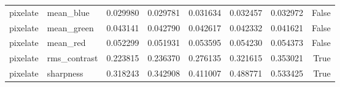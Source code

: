 \begin{tabular}{llrrrrrr}
pixelate & mean_blue & 0.029980 & 0.029781 & 0.031634 & 0.032457 & 0.032972 & False \\
pixelate & mean_green & 0.043141 & 0.042790 & 0.042617 & 0.042332 & 0.041621 & False \\
pixelate & mean_red & 0.052299 & 0.051931 & 0.053595 & 0.054230 & 0.054373 & False \\
pixelate & rms_contrast & 0.223815 & 0.236370 & 0.276135 & 0.321615 & 0.353021 & True \\
pixelate & sharpness & 0.318243 & 0.342908 & 0.411007 & 0.488771 & 0.533425 & True \\
\bottomrule
\end{tabular}
